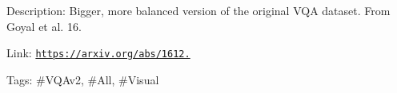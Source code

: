 Description\+: Bigger, more balanced version of the original V\+QA dataset. From Goyal et al. \textquotesingle{}16.

Link\+: \href{https://arxiv.org/abs/1612.00837}{\tt https\+://arxiv.\+org/abs/1612.}

Tags\+: \#\+V\+Q\+Av2, \#\+All, \#\+Visual 